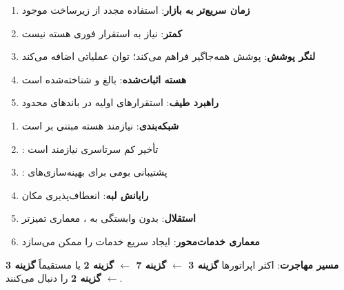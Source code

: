 \begin{enumerate}
\def\labelenumi{\arabic{enumi}.}
\tightlist
\item
  \textbf{زمان سریع‌تر به بازار}: استفاده مجدد از زیرساخت  موجود
\item
  \textbf{ کمتر}: نیاز به استقرار فوری هسته  نیست
\item
  \textbf{لنگر پوشش}:  پوشش همه‌جاگیر فراهم می‌کند؛  توان عملیاتی اضافه می‌کند
\item
  \textbf{هسته اثبات‌شده}:  بالغ و شناخته‌شده است
\item
  \textbf{راهبرد طیف}: استقرارهای اولیه  در باندهای محدود
\end{enumerate}


\begin{enumerate}
\def\labelenumi{\arabic{enumi}.}
\tightlist
\item
  \textbf{شبکه‌بندی}: نیازمند هسته  مبتنی بر  است
\item
  : تأخیر کم سرتاسری نیازمند  است
\item
  : پشتیبانی بومی  برای بهینه‌سازی‌های 
\item
  \textbf{رایانش لبه}: انعطاف‌پذیری مکان 
\item
  \textbf{استقلال}: بدون وابستگی به ، معماری تمیزتر
\item
  \textbf{معماری خدمات‌محور}: ایجاد سریع خدمات را ممکن می‌سازد
\end{enumerate}







\textbf{مسیر مهاجرت}: اکثر اپراتورها \textbf{گزینه 3 \ensuremath{\leftarrow} گزینه 7 \ensuremath{\leftarrow} گزینه 2} یا مستقیماً \textbf{گزینه 3 \ensuremath{\leftarrow} گزینه 2} را دنبال می‌کنند.

